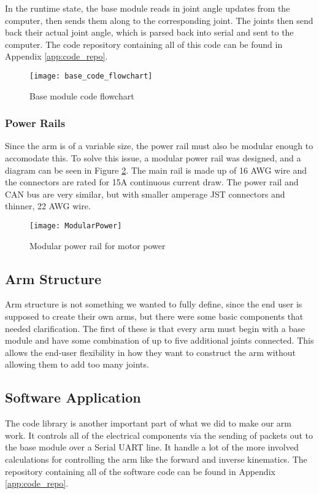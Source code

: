 \noindent In the runtime state, the base module reads in joint angle updates from the computer, then sends them along to the corresponding joint. The joints then send back their actual joint angle, which is parsed back into serial and sent to the computer. The code repository containing all of this code can be found in Appendix \ref{app:code_repo}.

\begin{figure}[H]
	\centering
	\texttt{[image: base\_code\_flowchart]}
	\caption{Base module code flowchart}
	\label{fig:base_code_flowchart}
\end{figure}

\subsubsection{Power Rails}
Since the arm is of a variable size, the power rail must also be modular enough to accomodate this. To solve this issue, a modular power rail was designed, and a diagram can be seen in Figure \ref{fig:power_rail}. The main rail is made up of 16 AWG wire and the connectors are rated for 15A continuous current draw. The power rail and CAN bus are very similar, but with smaller amperage JST connectors and thinner, 22 AWG wire.

\begin{figure}[H]
	\centering
	\texttt{[image: ModularPower]}
	\caption{Modular power rail for motor power}
	\label{fig:power_rail}
\end{figure}

\subsection{Arm Structure}
Arm structure is not something we wanted to fully define, since the end user is supposed to create their own arms, but there were some basic components that needed clarification. The first of these is that every arm must begin with a base module and have some combination of up to five additional joints connected.  This allows the end-user flexibility in how they want to construct the arm without allowing them to add too many joints. 


\subsection{Software Application}
The code library is another important part of what we did to make our arm work. It controls all of the electrical components via the sending of packets out to the base module over a Serial UART line. It handle a lot of the more involved calculations for controlling the arm like the forward and inverse kinematics. The repository containing all of the software code can be found in Appendix \ref{app:code_repo}.


